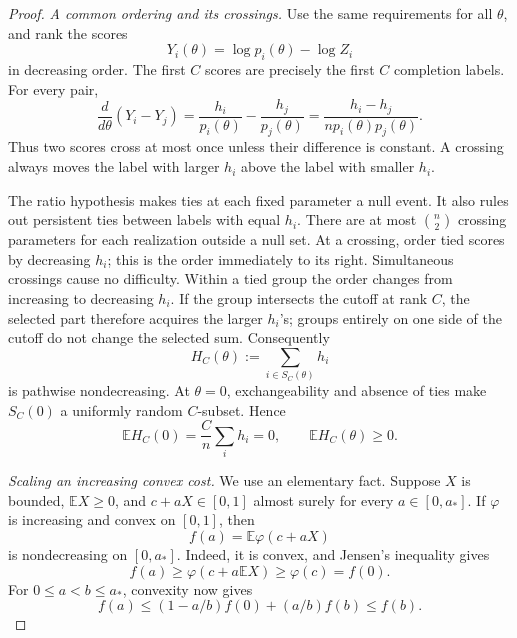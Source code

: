 \documentclass[11pt]{article}
\theoremstyle{definition}
\theoremstyle{remark}
\newcommand{\E}{\mathbb E}
\newcommand{\1}{\mathbf 1}
\begin{document}
\begin{proof}
\emph{A common ordering and its crossings.}
Use the same requirements for all \(\theta\), and rank the scores
\[
  Y_i(\theta)=\log p_i(\theta)-\log Z_i
\]
in decreasing order.  The first \(C\) scores are precisely the
first \(C\) completion labels.  For every pair,
\begin{equation}\label{eq:completed-mass-crossing-derivative}
  \frac d{d\theta}(Y_i-Y_j)
  =\frac{h_i}{p_i(\theta)}-\frac{h_j}{p_j(\theta)}
  =\frac{h_i-h_j}{n p_i(\theta)p_j(\theta)}.
\end{equation}
Thus two scores cross at most once unless their difference is
constant.  A crossing always moves the label with larger \(h_i\)
above the label with smaller \(h_i\).

The ratio hypothesis makes ties at each fixed parameter a null
event.  It also rules out persistent ties between labels with equal
\(h_i\).  There are at most \(\binom n2\) crossing parameters for
each realization outside a null set.  At a crossing, order tied
scores by decreasing \(h_i\); this is the order immediately to its
right.  Simultaneous crossings cause no difficulty.  Within a tied
group the order changes from increasing to decreasing \(h_i\).
If the group intersects the cutoff at rank \(C\), the selected
part therefore acquires the larger \(h_i\)'s; groups entirely on
one side of the cutoff do not change the selected sum.
Consequently
\begin{equation}\label{eq:completed-h-mass}
  H_C(\theta):=\sum_{i\in S_C(\theta)}h_i
\end{equation}
is pathwise nondecreasing.  At \(\theta=0\), exchangeability and
absence of ties make \(S_C(0)\) a uniformly random \(C\)-subset.
Hence
\begin{equation}\label{eq:completed-h-mean}
  \E H_C(0)=\frac Cn\sum_i h_i=0,
  \qquad \E H_C(\theta)\ge0.
\end{equation}

\medskip\noindent\emph{Scaling an increasing convex cost.}
We use an elementary fact.  Suppose \(X\) is bounded,
\(\E X\ge0\), and \(c+aX\in[0,1]\) almost surely for every
\(a\in[0,a_*]\).  If \(\varphi\) is increasing and convex on
\([0,1]\), then
\[
  f(a)=\E\varphi(c+aX)
\]
is nondecreasing on \([0,a_*]\).  Indeed, it is convex, and Jensen's
inequality gives
\[
  f(a)\ge\varphi(c+a\E X)\ge\varphi(c)=f(0).
\]
For \(0\le a<b\le a_*\), convexity now gives
\[
  f(a)\le(1-a/b)f(0)+(a/b)f(b)\le f(b).
\]


\end{proof}
\end{document}
